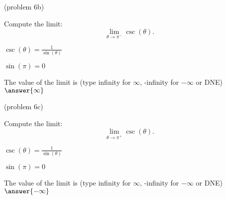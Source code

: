\documentclass[handout]{ximera}
\begin{document}
\begin{problem}(problem 6b)
  
	Compute the limit:
  \[
  \lim_{\theta \to {\pi^-}} \csc(\theta).
  \]
		\begin{hint}
		  $\csc(\theta) = \frac{1}{\sin(\theta)}$
		\end{hint}	
		\begin{hint}
		  $\sin(\pi) = 0$
		\end{hint}
		The value of the limit is
		(type infinity for $\infty$, -infinity for $-\infty$ or DNE)
		 $\answer{\infty}$
		
\end{problem}

\begin{problem}(problem 6c)
  
	Compute the limit:
  \[
  \lim_{\theta \to {\pi^+}} \csc(\theta).
  \]
		\begin{hint}
		  $\csc(\theta) = \frac{1}{\sin(\theta)}$
		\end{hint}	
		\begin{hint}
		  $\sin(\pi) = 0$
		\end{hint}
		The value of the limit is
		(type infinity for $\infty$, -infinity for $-\infty$ or DNE)
		 $\answer{-\infty}$
		
\end{problem}


\begin{center}
\begin{foldable}
\end{foldable}
\end{center}
\end{document}

